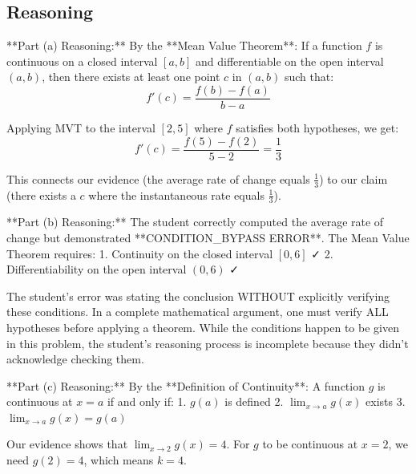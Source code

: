 \documentclass[11pt,letterpaper]{article}
\begin{document}
\subsection*{\textcolor{alphacyan}{Reasoning}}
\begin{tcolorbox}[colback=alphacyan!5!white, colframe=alphacyan!50, arc=2mm]
  **Part (a) Reasoning:**
By the **Mean Value Theorem**: If a function $f$ is continuous on a closed interval $[a, b]$ and differentiable on the open interval $(a, b)$, then there exists at least one point $c$ in $(a, b)$ such that:
$$f'(c) = \frac{f(b) - f(a)}{b - a}$$

Applying MVT to the interval $[2, 5]$ where $f$ satisfies both hypotheses, we get:
$$f'(c) = \frac{f(5) - f(2)}{5 - 2} = \frac{1}{3}$$

This connects our evidence (the average rate of change equals $\frac{1}{3}$) to our claim (there exists a $c$ where the instantaneous rate equals $\frac{1}{3}$).

**Part (b) Reasoning:**
The student correctly computed the average rate of change but demonstrated **CONDITION_BYPASS ERROR**. The Mean Value Theorem requires:
1. Continuity on the closed interval $[0, 6]$ ✓
2. Differentiability on the open interval $(0, 6)$ ✓

The student's error was stating the conclusion WITHOUT explicitly verifying these conditions. In a complete mathematical argument, one must verify ALL hypotheses before applying a theorem. While the conditions happen to be given in this problem, the student's reasoning process is incomplete because they didn't acknowledge checking them.

**Part (c) Reasoning:**
By the **Definition of Continuity**: A function $g$ is continuous at $x = a$ if and only if:
1. $g(a)$ is defined
2. $\lim_{x \to a} g(x)$ exists
3. $\lim_{x \to a} g(x) = g(a)$

Our evidence shows that $\lim_{x \to 2} g(x) = 4$. For $g$ to be continuous at $x = 2$, we need $g(2) = 4$, which means $k = 4$.
\end{tcolorbox}
\end{document}
